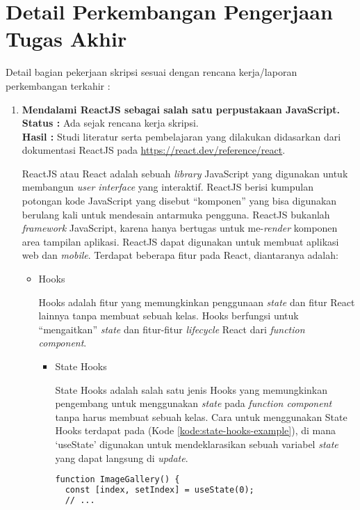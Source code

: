 \documentclass[a4paper,twoside]{article}
\begin{document}
\section{Detail Perkembangan Pengerjaan Tugas Akhir}
Detail bagian pekerjaan skripsi sesuai dengan rencana kerja/laporan perkembangan terkahir :
	\begin{enumerate}
		\item \textbf{Mendalami ReactJS sebagai salah satu perpustakaan JavaScript.}\\
		{\bf Status :} Ada sejak rencana kerja skripsi.\\
		{\bf Hasil :} Studi literatur serta pembelajaran yang dilakukan didasarkan dari dokumentasi ReactJS pada \url{https://react.dev/reference/react}.

ReactJS atau React adalah sebuah \textit{library} JavaScript yang digunakan untuk membangun \textit{user interface} yang interaktif. ReactJS berisi kumpulan potongan kode JavaScript yang disebut ``komponen'' yang bisa digunakan berulang kali untuk mendesain antarmuka pengguna. ReactJS bukanlah \textit{framework} JavaScript, karena hanya bertugas untuk me-\textit{render} komponen area tampilan aplikasi. ReactJS dapat digunakan untuk membuat aplikasi web dan \textit{mobile}. Terdapat beberapa fitur pada React, diantaranya adalah:

\begin{itemize}
    \item Hooks
    
    Hooks adalah fitur yang memungkinkan penggunaan \textit{state} dan fitur React lainnya tanpa membuat sebuah kelas. Hooks berfungsi untuk ``mengaitkan'' \textit{state} dan fitur-fitur \textit{lifecycle} React dari \textit{function component}. 

    \begin{itemize}
        \item State Hooks

        State Hooks adalah salah satu jenis Hooks yang memungkinkan pengembang untuk menggunakan \textit{state} pada \textit{function component} tanpa harus membuat sebuah kelas. Cara untuk menggunakan State Hooks terdapat pada (Kode \ref{kode:state-hooks-example}), di mana `useState' digunakan untuk mendeklarasikan sebuah variabel \textit{state} yang dapat langsung di \textit{update}.
\begin{lstlisting}[language=HTML, caption=Contoh Potongan Kode State Hooks, label=kode:state-hooks-example]
function ImageGallery() {
  const [index, setIndex] = useState(0);
  // ...
\end{lstlisting}


\end{itemize}
\end{itemize}
\end{enumerate}
\end{document}
